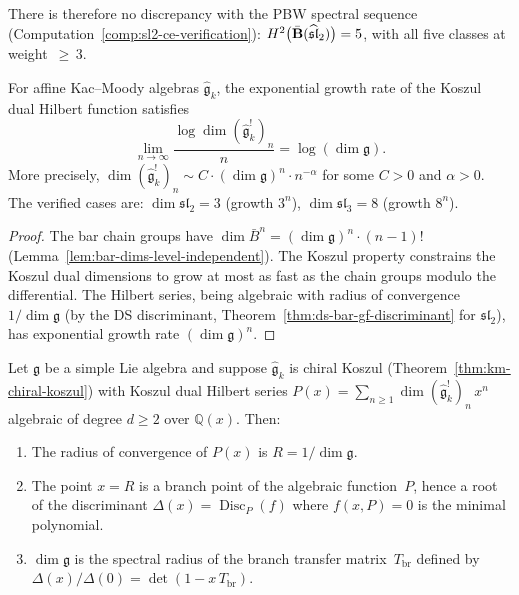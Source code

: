 \begin{lemma}
There is therefore no discrepancy with the PBW spectral sequence
(Computation~\ref{comp:sl2-ce-verification}):
$H^2\bigl(\bar{\mathbf{B}}(\widehat{\mathfrak{sl}}_2)\bigr) = 5$,
with all five classes at weight~${\geq}\, 3$.
\end{lemma}

\begin{corollary}
\label{cor:growth-rate-dimg}
For affine Kac--Moody algebras $\widehat{\mathfrak{g}}_k$, the exponential growth rate of the Koszul dual Hilbert function satisfies
\[
\lim_{n \to \infty} \frac{\log \dim (\widehat{\mathfrak{g}}_k^!)_n}{n} = \log(\dim \mathfrak{g}).
\]
More precisely, $\dim (\widehat{\mathfrak{g}}_k^!)_n \sim C \cdot (\dim \mathfrak{g})^n \cdot n^{-\alpha}$ for some $C > 0$ and $\alpha > 0$.  The verified cases are: $\dim \mathfrak{sl}_2 = 3$ (growth $3^n$), $\dim \mathfrak{sl}_3 = 8$ (growth $8^n$).
\end{corollary}

\begin{proof}
The bar chain groups have $\dim \bar{B}^n = (\dim \mathfrak{g})^n \cdot (n{-}1)!$ (Lemma~\ref{lem:bar-dims-level-independent}).  The Koszul property constrains the Koszul dual dimensions to grow at most as fast as the chain groups modulo the differential.  The Hilbert series, being algebraic with radius of convergence $1/\dim\mathfrak{g}$ (by the DS discriminant, Theorem~\ref{thm:ds-bar-gf-discriminant} for $\mathfrak{sl}_2$), has exponential growth rate $(\dim \mathfrak{g})^n$.
\end{proof}

\begin{theorem}
\label{thm:dominant-branch-point}
Let $\mathfrak{g}$ be a simple Lie algebra and suppose
$\widehat{\mathfrak{g}}_k$ is chiral Koszul
\textup{(}Theorem~\textup{\ref{thm:km-chiral-koszul})} with
Koszul dual Hilbert series
$P(x) = \sum_{n \geq 1} \dim(\widehat{\mathfrak{g}}_k^!)_n\, x^n$
algebraic of degree $d \geq 2$ over $\mathbb{Q}(x)$.  Then:
\begin{enumerate}[label=\textup{(\roman*)}]
\item The radius of convergence of $P(x)$ is
  $R = 1/\dim\mathfrak{g}$.
\item The point $x = R$ is a branch point of the algebraic
  function~$P$, hence a root of the discriminant
  $\Delta(x) = \operatorname{Disc}_P(f)$ where
  $f(x,P) = 0$ is the minimal polynomial.
\item $\dim\mathfrak{g}$ is the spectral radius of the branch
  transfer matrix~$T_{\mathrm{br}}$ defined by
  $\Delta(x)/\Delta(0) = \det(1 - x\,T_{\mathrm{br}})$.
\end{enumerate}
\end{theorem}

